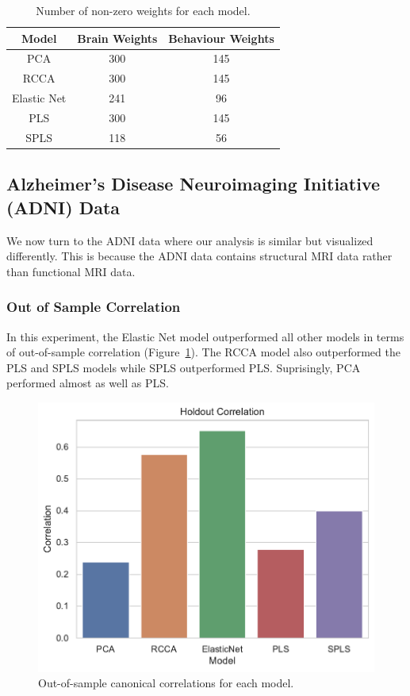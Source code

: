 \begin{table}[h]
\centering
\caption{Number of non-zero weights for each model.}
\begin{tabular}{|c|c|c|}
\hline
Model &  Brain Weights &  Behaviour Weights \\
\hline
PCA        &            300 &                145 \\
RCCA       &            300 &                145 \\
Elastic Net &            241 &                 96 \\
PLS        &            300 &                145 \\
SPLS       &            118 &                 56 \\
\hline
\end{tabular}\label{tab:brain-behaviour-weights-hcp}
\end{table}

\newpage
\subsection{Alzheimer's Disease Neuroimaging Initiative (ADNI) Data}\label{subsec:adni}

We now turn to the ADNI data where our analysis is similar but visualized differently.
This is because the ADNI data contains structural MRI data rather than functional MRI data.

\subsubsection{Out of Sample Correlation}

In this experiment, the Elastic Net model outperformed all other models in terms of out-of-sample correlation (Figure~\ref{fig:performance}).
The RCCA model also outperformed the PLS and SPLS models while SPLS outperformed PLS.
Suprisingly, PCA performed almost as well as PLS.

\begin{figure}
\centering
\includegraphics[width=0.5\linewidth]{figures/regularization/adni/holdout_correlations}
\caption{Out-of-sample canonical correlations for each model.}\label{fig:performance}
\end{figure}

